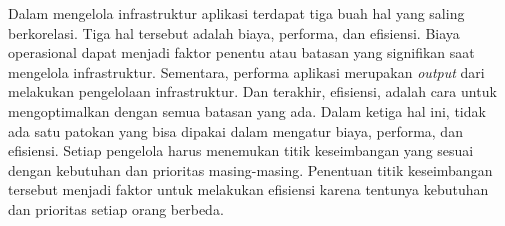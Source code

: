Dalam mengelola infrastruktur aplikasi terdapat tiga buah hal yang saling berkorelasi. Tiga hal tersebut adalah biaya, performa, dan efisiensi. Biaya operasional dapat menjadi faktor penentu atau batasan yang signifikan saat mengelola infrastruktur. Sementara, performa aplikasi merupakan \textit{output} dari melakukan pengelolaan infrastruktur. Dan terakhir, efisiensi, adalah cara untuk mengoptimalkan dengan semua batasan yang ada. Dalam ketiga hal ini, tidak ada satu patokan yang bisa dipakai dalam mengatur biaya, performa, dan efisiensi. Setiap pengelola harus menemukan titik keseimbangan yang sesuai dengan kebutuhan dan prioritas masing-masing. Penentuan titik keseimbangan tersebut menjadi faktor untuk melakukan efisiensi karena tentunya kebutuhan dan prioritas setiap orang berbeda.
